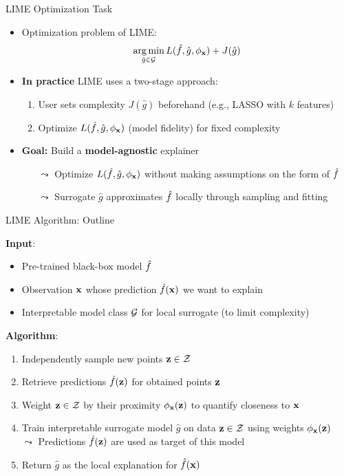 \documentclass[10pt,compress,t,notes=noshow, xcolor=table]{beamer}
\newcommand{\gh}{\hat{g}}
\begin{document}
\begin{frame}{LIME Optimization Task}
	\begin{itemize}
		\item Optimization problem of LIME: 
		$$ \argmin_{\gh \in \Gspace} L(\fh, \gh, \neigh) + J(\gh)$$
		\item \textbf{In practice} LIME uses a two-stage approach:
		\begin{enumerate}
                \item User sets complexity $J(\gh)$ beforehand (e.g., LASSO with \( k \) features)
		    \item Optimize $L(\fh, \gh, \neigh)$ (model fidelity) for fixed complexity
		\end{enumerate}
		\item \textbf{Goal:} Build a \textbf{model-agnostic} explainer
		\begin{itemize}
    		\item[$\leadsto$] Optimize $L(\fh, \gh, \neigh)$ without making assumptions on the form of $\hat{f}$ 
    		\item[$\leadsto$] Surrogate \( \gh \) approximates \( \hat{f} \) locally through sampling and fitting
		\end{itemize}
		\end{itemize}
\end{frame} 

\begin{frame}{LIME Algorithm: Outline }
		
		\textbf{Input}:
		\begin{itemize}
		    \item Pre-trained black-box model $\hat{f}$
		    \item Observation $\mathbf{x}$ whose prediction $\hat{f}(\mathbf{x})$ we want to explain
		    \item Interpretable model class $\mathcal{G}$ for local surrogate (to limit complexity)
		\end{itemize}
		
		\pause
		\medskip
		
		\textbf{Algorithm}:
		\begin{enumerate}
    		\item Independently sample new points $\mathbf{z} \in \mathcal{Z}$ 
    		\item Retrieve predictions $\hat{f}(\mathbf{z})$ for obtained points $\mathbf{z}$ 
    		\item Weight $\mathbf{z} \in \mathcal{Z}$ by their proximity $\phi_{\mathbf{x}}(\mathbf{z})$ to quantify closeness to \( \mathbf{x} \)
    		\item Train interpretable surrogate model $\gh$ on data $\mathbf{z} \in \mathcal{Z}$ using weights $\phi_{\mathbf{x}}(\mathbf{z})$\\ $\leadsto$ Predictions $\hat{f}(\mathbf{z})$ are used as target of this model
    		\item Return \( \gh \) as the local explanation for \( \hat{f}(\mathbf{x}) \)
		\end{enumerate}
		

	
\end{frame} 
\end{document}
